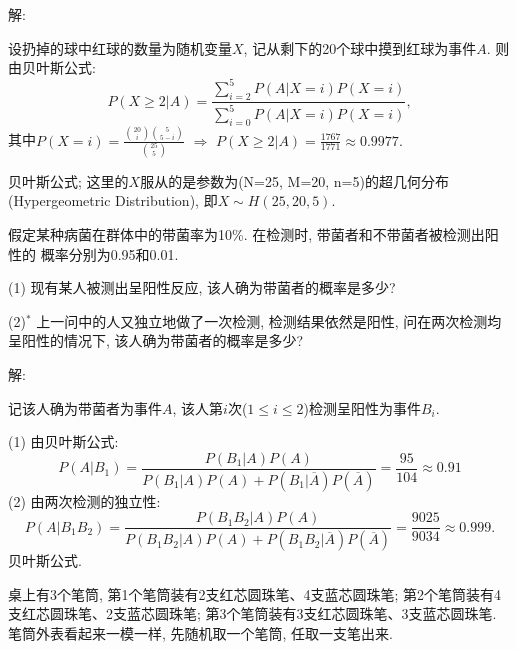 \documentclass[standard]{ExBook}
\renewenvironment{shaded}{%
  \def\FrameCommand{\fboxsep=\FrameSep \colorbox{shadecolor}}%
  \MakeFramed{\advance\hsize-\width \FrameRestore}%
}{%
  \endMakeFramed
}
\begin{document}
\begin{qitems}
\vspace{\dimexpr2.5cm-5em\relax}

解: 

设扔掉的球中红球的数量为随机变量$X$, 记从剩下的20个球中摸到红球为事件$A$. 则由贝叶斯公式:
$$P(X\geq2|A)=\frac{\sum\limits_{i=2}^{5}P(A|X=i)P(X=i)}{\sum\limits_{i=0}^{5}P(A|X=i)P(X=i)},$$
其中$P(X=i)=\displaystyle\frac{\binom{20}{i}\binom{5}{5-i}}{\binom{25}{5}}$ $\Rightarrow$ $P(X\geq2|A)=\frac{1767}{1771}\approx0.9977.$

\textcolor{themeColor}{\selectfont {} 贝叶斯公式; 这里的$X$服从的是参数为(N=25, M=20, n=5)的超几何分布(Hypergeometric Distribution), 即$X\sim H(25,20,5)$.}

\vspace{2.5cm-5em}

    \begin{bbox}
    \begin{shaded}
        \qitem
假定某种病菌在群体中的带菌率为10\%. 在检测时, 带菌者和不带菌者被检测出阳性的
概率分别为0.95和0.01.

(1) 现有某人被测出呈阳性反应, 该人确为带菌者的概率是多少?

(2)$^*$  上一问中的人又独立地做了一次检测, 检测结果依然是阳性, 问在两次检测均呈阳性的情况下, 该人确为带菌者的概率是多少?
    \end{shaded}
    \end{bbox}

\vspace{\dimexpr2.5cm-5em\relax}

解: 

记该人确为带菌者为事件$A$, 该人第$i$次($1 \leq i \leq 2$)检测呈阳性为事件$B_{i}$.

(1) 由贝叶斯公式:
$$P(A|B_{1})=\frac{P(B_{1}|A)P(A)}{P(B_{1}|A)P(A)+P(B_{1}|\overline{A})P(\overline{A})}=\frac{95}{104}\approx0.91$$
(2) 由两次检测的独立性:
$$P(A|B_{1}B_{2})=\frac{P(B_{1}B_{2}|A)P(A)}{P(B_{1}B_{2}|A)P(A)+P(B_{1}B_{2}|\overline{A})P(\overline{A})}=\frac{9025}{9034}\approx0.999.$$
\textcolor{themeColor}{\selectfont {} 贝叶斯公式.}

\vspace{2.5cm-5em}

    \begin{bbox}
    \begin{shaded}
        \qitem
桌上有3个笔筒, 第1个笔筒装有2支红芯圆珠笔、4支蓝芯圆珠笔; 第2个笔筒装有4支红芯圆珠笔、2支蓝芯圆珠笔; 第3个笔筒装有3支红芯圆珠笔、3支蓝芯圆珠笔. 笔筒外表看起来一模一样, 先随机取一个笔筒, 任取一支笔出来.


\end{shaded}
\end{bbox}
\end{qitems}
\end{document}
